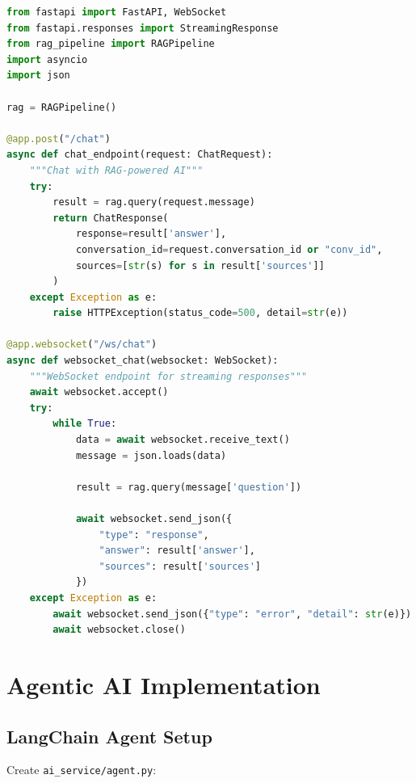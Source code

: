 \documentclass{report}
\begin{document}
\begin{lstlisting}[language=python, caption=RAG chat endpoint]
from fastapi import FastAPI, WebSocket
from fastapi.responses import StreamingResponse
from rag_pipeline import RAGPipeline
import asyncio
import json

rag = RAGPipeline()

@app.post("/chat")
async def chat_endpoint(request: ChatRequest):
    """Chat with RAG-powered AI"""
    try:
        result = rag.query(request.message)
        return ChatResponse(
            response=result['answer'],
            conversation_id=request.conversation_id or "conv_id",
            sources=[str(s) for s in result['sources']]
        )
    except Exception as e:
        raise HTTPException(status_code=500, detail=str(e))

@app.websocket("/ws/chat")
async def websocket_chat(websocket: WebSocket):
    """WebSocket endpoint for streaming responses"""
    await websocket.accept()
    try:
        while True:
            data = await websocket.receive_text()
            message = json.loads(data)
            
            result = rag.query(message['question'])
            
            await websocket.send_json({
                "type": "response",
                "answer": result['answer'],
                "sources": result['sources']
            })
    except Exception as e:
        await websocket.send_json({"type": "error", "detail": str(e)})
        await websocket.close()
\end{lstlisting}

\chapter{Agentic AI Implementation}

\section{LangChain Agent Setup}

Create \texttt{ai\_service/agent.py}:
\end{document}

